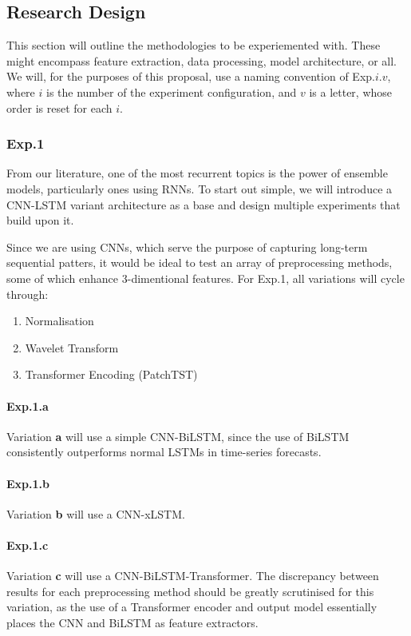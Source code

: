 \subsection{Research Design}

This section will outline the methodologies to be experiemented with. These might encompass feature extraction, data processing, model architecture, or all. We will, for the purposes of this proposal, use a naming convention of Exp.$i.v$, where $i$ is the number of the experiment configuration, and
$v$ is a letter, whose order is reset for each $i$.

\subsubsection{Exp.1}

From our literature, one of the most recurrent topics is the power of ensemble models, particularly ones using RNNs. To start out simple, we will introduce a CNN-LSTM variant architecture as a base and design multiple
experiments that build upon it.

Since we are using CNNs, which serve the purpose of capturing long-term sequential patters, it would be ideal to test an array of preprocessing methods, some of which enhance 3-dimentional features.
For Exp.1, all variations will cycle through:
\begin{enumerate}
    \item Normalisation
    \item Wavelet Transform\cite{4494757,Hiruta2025}
    \item Transformer Encoding (PatchTST\cite{PatchTST})
\end{enumerate}

\paragraph{Exp.1.a}
Variation \textbf{a} will use a simple CNN-BiLSTM, since the use of BiLSTM consistently outperforms normal LSTMs in time-series forecasts.
\paragraph{Exp.1.b}
Variation \textbf{b} will use a CNN-xLSTM.\
\paragraph{Exp.1.c}
Variation \textbf{c} will use a CNN-BiLSTM-Transformer. The discrepancy between results for each preprocessing method should be greatly scrutinised for this variation, as the use of a Transformer encoder and output model
essentially places the CNN and BiLSTM as feature extractors.
